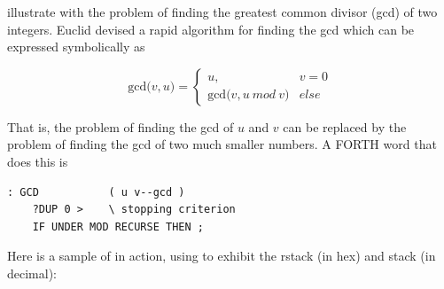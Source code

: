  illustrate with the problem of finding the greatest common divisor (gcd) of two integers. Euclid devised a rapid algorithm for finding the gcd which can be expressed symbolically as

\begin{equation}
    \text{gcd(}v, u \text{)} =
    \begin{cases}
        u, & v= 0 \\
        \text{gcd(}v, u\ mod\ v\text{)} & else
    \end{cases}
\end{equation}
    
That is, the problem of finding the gcd of $u$ and $v$ can be replaced by the problem of finding the gcd of two much smaller numbers. A FORTH word that does this is

\begin{lstlisting}
: GCD           ( u v--gcd )
    ?DUP 0 >    \ stopping criterion
    IF UNDER MOD RECURSE THEN ;
\end{lstlisting}

Here is a sample of  in action, using  to exhibit the rstack (in hex) and stack (in decimal):

